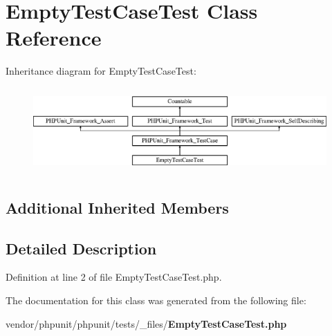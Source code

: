 \section{Empty\+Test\+Case\+Test Class Reference}
\label{class_empty_test_case_test}
Inheritance diagram for Empty\+Test\+Case\+Test\+:\begin{figure}[H]
\begin{center}
\leavevmode
\includegraphics[height=3.303835cm]{class_empty_test_case_test}
\end{center}
\end{figure}
\subsection*{Additional Inherited Members}


\subsection{Detailed Description}


Definition at line 2 of file Empty\+Test\+Case\+Test.\+php.



The documentation for this class was generated from the following file\+:\begin{DoxyCompactItemize}
\item 
vendor/phpunit/phpunit/tests/\+\_\+files/{\bf Empty\+Test\+Case\+Test.\+php}\end{DoxyCompactItemize}
